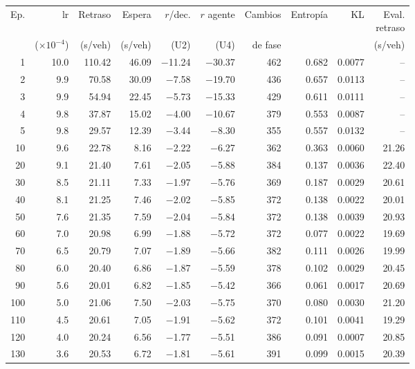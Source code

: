\begin{table}[H]
\centering
\scriptsize
\setlength{\tabcolsep}{3pt}
\setlength{\tabcolsep}{2pt}
\begin{tabular}{rrrrrrrrrr}
\toprule
Ep. & lr & Retraso & Espera & $r$/dec. & $r$ agente & Cambios & Entropía & KL & \makecell{Eval.\\retraso} \\
 & ($\times 10^{-4}$) & (s/veh) & (s/veh) & (U2) & (U4) & de fase &  &  & (s/veh) \\
\midrule
1 & 10.0 & 110.42 & 46.09 & $-$11.24 & $-$30.37 & 462 & 0.682 & 0.0077 & -- \\
2 & 9.9 & 70.58 & 30.09 & $-$7.58 & $-$19.70 & 436 & 0.657 & 0.0113 & -- \\
3 & 9.9 & 54.94 & 22.45 & $-$5.73 & $-$15.33 & 429 & 0.611 & 0.0111 & -- \\
4 & 9.8 & 37.87 & 15.02 & $-$4.00 & $-$10.67 & 379 & 0.553 & 0.0087 & -- \\
5 & 9.8 & 29.57 & 12.39 & $-$3.44 & $-$8.30 & 355 & 0.557 & 0.0132 & -- \\
10 & 9.6 & 22.78 & 8.16 & $-$2.22 & $-$6.27 & 362 & 0.363 & 0.0060 & 21.26 \\
20 & 9.1 & 21.40 & 7.61 & $-$2.05 & $-$5.88 & 384 & 0.137 & 0.0036 & 22.40 \\
30 & 8.5 & 21.11 & 7.33 & $-$1.97 & $-$5.76 & 369 & 0.187 & 0.0029 & 20.61 \\
40 & 8.1 & 21.25 & 7.46 & $-$2.02 & $-$5.85 & 372 & 0.138 & 0.0022 & 20.01 \\
50 & 7.6 & 21.35 & 7.59 & $-$2.04 & $-$5.84 & 372 & 0.138 & 0.0039 & 20.93 \\
60 & 7.0 & 20.98 & 6.99 & $-$1.88 & $-$5.72 & 372 & 0.077 & 0.0022 & 19.69 \\
70 & 6.5 & 20.79 & 7.07 & $-$1.89 & $-$5.66 & 382 & 0.111 & 0.0026 & 19.99 \\
80 & 6.0 & 20.40 & 6.86 & $-$1.87 & $-$5.59 & 378 & 0.102 & 0.0029 & 20.45 \\
90 & 5.6 & 20.01 & 6.82 & $-$1.85 & $-$5.42 & 366 & 0.061 & 0.0017 & 20.69 \\
100 & 5.0 & 21.06 & 7.50 & $-$2.03 & $-$5.75 & 370 & 0.080 & 0.0030 & 21.20 \\
110 & 4.5 & 20.61 & 7.05 & $-$1.91 & $-$5.62 & 372 & 0.101 & 0.0041 & 19.29 \\
120 & 4.0 & 20.24 & 6.56 & $-$1.77 & $-$5.51 & 386 & 0.091 & 0.0007 & 20.85 \\
130 & 3.6 & 20.53 & 6.72 & $-$1.81 & $-$5.61 & 391 & 0.099 & 0.0015 & 20.39 \\

\end{tabular}
\end{table}
